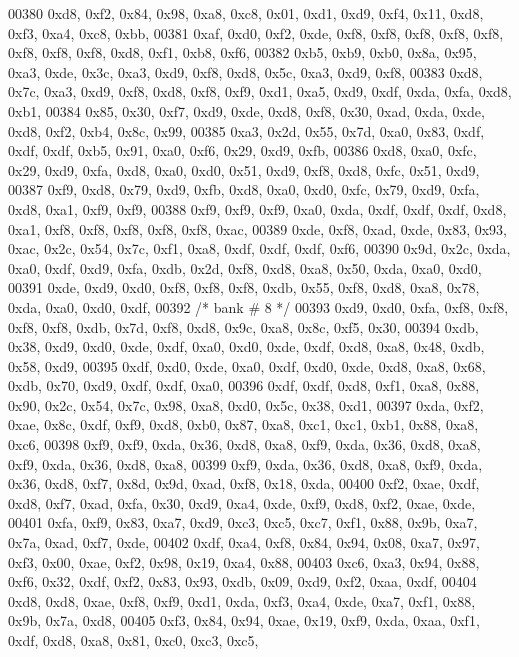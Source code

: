 \begin{DoxyCode}
00380     0xd8, 0xf2, 0x84, 0x98, 0xa8, 0xc8, 0x01, 0xd1, 0xd9, 0xf4, 0x11, 0xd8, 0xf3, 0xa4, 0xc8, 0xbb,
00381     0xaf, 0xd0, 0xf2, 0xde, 0xf8, 0xf8, 0xf8, 0xf8, 0xf8, 0xf8, 0xf8, 0xf8, 0xd8, 0xf1, 0xb8, 0xf6,
00382     0xb5, 0xb9, 0xb0, 0x8a, 0x95, 0xa3, 0xde, 0x3c, 0xa3, 0xd9, 0xf8, 0xd8, 0x5c, 0xa3, 0xd9, 0xf8,
00383     0xd8, 0x7c, 0xa3, 0xd9, 0xf8, 0xd8, 0xf8, 0xf9, 0xd1, 0xa5, 0xd9, 0xdf, 0xda, 0xfa, 0xd8, 0xb1,
00384     0x85, 0x30, 0xf7, 0xd9, 0xde, 0xd8, 0xf8, 0x30, 0xad, 0xda, 0xde, 0xd8, 0xf2, 0xb4, 0x8c, 0x99,
00385     0xa3, 0x2d, 0x55, 0x7d, 0xa0, 0x83, 0xdf, 0xdf, 0xdf, 0xb5, 0x91, 0xa0, 0xf6, 0x29, 0xd9, 0xfb,
00386     0xd8, 0xa0, 0xfc, 0x29, 0xd9, 0xfa, 0xd8, 0xa0, 0xd0, 0x51, 0xd9, 0xf8, 0xd8, 0xfc, 0x51, 0xd9,
00387     0xf9, 0xd8, 0x79, 0xd9, 0xfb, 0xd8, 0xa0, 0xd0, 0xfc, 0x79, 0xd9, 0xfa, 0xd8, 0xa1, 0xf9, 0xf9,
00388     0xf9, 0xf9, 0xf9, 0xa0, 0xda, 0xdf, 0xdf, 0xdf, 0xd8, 0xa1, 0xf8, 0xf8, 0xf8, 0xf8, 0xf8, 0xac,
00389     0xde, 0xf8, 0xad, 0xde, 0x83, 0x93, 0xac, 0x2c, 0x54, 0x7c, 0xf1, 0xa8, 0xdf, 0xdf, 0xdf, 0xf6,
00390     0x9d, 0x2c, 0xda, 0xa0, 0xdf, 0xd9, 0xfa, 0xdb, 0x2d, 0xf8, 0xd8, 0xa8, 0x50, 0xda, 0xa0, 0xd0,
00391     0xde, 0xd9, 0xd0, 0xf8, 0xf8, 0xf8, 0xdb, 0x55, 0xf8, 0xd8, 0xa8, 0x78, 0xda, 0xa0, 0xd0, 0xdf,
00392     \textcolor{comment}{/* bank # 8 */}
00393     0xd9, 0xd0, 0xfa, 0xf8, 0xf8, 0xf8, 0xf8, 0xdb, 0x7d, 0xf8, 0xd8, 0x9c, 0xa8, 0x8c, 0xf5, 0x30,
00394     0xdb, 0x38, 0xd9, 0xd0, 0xde, 0xdf, 0xa0, 0xd0, 0xde, 0xdf, 0xd8, 0xa8, 0x48, 0xdb, 0x58, 0xd9,
00395     0xdf, 0xd0, 0xde, 0xa0, 0xdf, 0xd0, 0xde, 0xd8, 0xa8, 0x68, 0xdb, 0x70, 0xd9, 0xdf, 0xdf, 0xa0,
00396     0xdf, 0xdf, 0xd8, 0xf1, 0xa8, 0x88, 0x90, 0x2c, 0x54, 0x7c, 0x98, 0xa8, 0xd0, 0x5c, 0x38, 0xd1,
00397     0xda, 0xf2, 0xae, 0x8c, 0xdf, 0xf9, 0xd8, 0xb0, 0x87, 0xa8, 0xc1, 0xc1, 0xb1, 0x88, 0xa8, 0xc6,
00398     0xf9, 0xf9, 0xda, 0x36, 0xd8, 0xa8, 0xf9, 0xda, 0x36, 0xd8, 0xa8, 0xf9, 0xda, 0x36, 0xd8, 0xa8,
00399     0xf9, 0xda, 0x36, 0xd8, 0xa8, 0xf9, 0xda, 0x36, 0xd8, 0xf7, 0x8d, 0x9d, 0xad, 0xf8, 0x18, 0xda,
00400     0xf2, 0xae, 0xdf, 0xd8, 0xf7, 0xad, 0xfa, 0x30, 0xd9, 0xa4, 0xde, 0xf9, 0xd8, 0xf2, 0xae, 0xde,
00401     0xfa, 0xf9, 0x83, 0xa7, 0xd9, 0xc3, 0xc5, 0xc7, 0xf1, 0x88, 0x9b, 0xa7, 0x7a, 0xad, 0xf7, 0xde,
00402     0xdf, 0xa4, 0xf8, 0x84, 0x94, 0x08, 0xa7, 0x97, 0xf3, 0x00, 0xae, 0xf2, 0x98, 0x19, 0xa4, 0x88,
00403     0xc6, 0xa3, 0x94, 0x88, 0xf6, 0x32, 0xdf, 0xf2, 0x83, 0x93, 0xdb, 0x09, 0xd9, 0xf2, 0xaa, 0xdf,
00404     0xd8, 0xd8, 0xae, 0xf8, 0xf9, 0xd1, 0xda, 0xf3, 0xa4, 0xde, 0xa7, 0xf1, 0x88, 0x9b, 0x7a, 0xd8,
00405     0xf3, 0x84, 0x94, 0xae, 0x19, 0xf9, 0xda, 0xaa, 0xf1, 0xdf, 0xd8, 0xa8, 0x81, 0xc0, 0xc3, 0xc5,

\end{DoxyCode}

